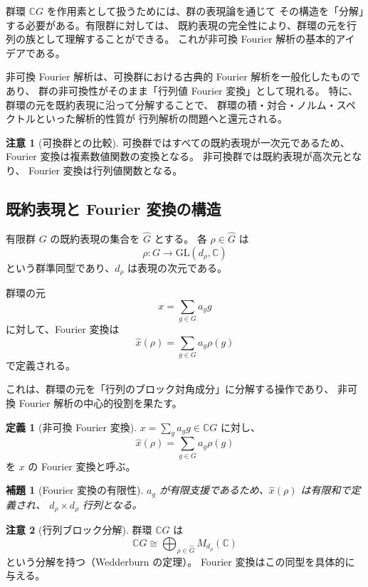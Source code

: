 \documentclass[12pt,a4paper]{ltjarticle}
\newtheorem*{lemma}{補題}
\theoremstyle{definition}
\newtheorem*{definition}{定義}
\newtheorem*{remark}{注意}
\begin{document}
群環 $\mathbb{C}G$ を作用素として扱うためには、群の表現論を通じて
その構造を「分解」する必要がある。有限群に対しては、
既約表現の完全性により、群環の元を行列の族として理解することができる。
これが非可換 Fourier 解析の基本的アイデアである。

非可換 Fourier 解析は、可換群における古典的 Fourier 解析を一般化したものであり、
群の非可換性がそのまま「行列値 Fourier 変換」として現れる。
特に、群環の元を既約表現に沿って分解することで、
群環の積・対合・ノルム・スペクトルといった解析的性質が
行列解析の問題へと還元される。

\begin{remark}[可換群との比較]
可換群ではすべての既約表現が一次元であるため、
Fourier 変換は複素数値関数の変換となる。
非可換群では既約表現が高次元となり、
Fourier 変換は行列値関数となる。
\end{remark}

\subsection{既約表現と Fourier 変換の構造}

有限群 $G$ の既約表現の集合を $\widehat{G}$ とする。
各 $\rho \in \widehat{G}$ は
\[
\rho : G \to \mathrm{GL}(d_\rho, \mathbb{C})
\]
という群準同型であり、$d_\rho$ は表現の次元である。

群環の元
\[
x = \sum_{g \in G} a_g g
\]
に対して、Fourier 変換は
\[
\widehat{x}(\rho) = \sum_{g \in G} a_g \rho(g)
\]
で定義される。

これは、群環の元を「行列のブロック対角成分」に分解する操作であり、
非可換 Fourier 解析の中心的役割を果たす。

\begin{definition}[非可換 Fourier 変換]
$x=\sum_g a_g g\in\mathbb{C}G$ に対し、
\[
\widehat{x}(\rho)=\sum_{g\in G}a_g\rho(g)
\]
を $x$ の Fourier 変換と呼ぶ。
\end{definition}

\begin{lemma}[Fourier 変換の有限性]
$a_g$ が有限支援であるため、$\widehat{x}(\rho)$ は有限和で定義され、
$d_\rho\times d_\rho$ 行列となる。
\end{lemma}

\begin{remark}[行列ブロック分解]
群環 $\mathbb{C}G$ は
\[
\mathbb{C}G \cong \bigoplus_{\rho\in\widehat{G}} M_{d_\rho}(\mathbb{C})
\]
という分解を持つ（Wedderburn の定理）。
Fourier 変換はこの同型を具体的に与える。
\end{remark}
\end{document}
